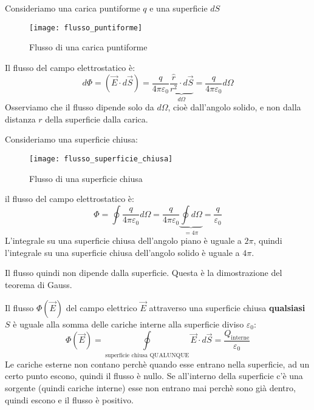 \documentclass[a4paper]{article}
\begin{document}
\begin{example}
  Consideriamo una carica puntiforme \( q \) e una superficie \( dS \) 
  \begin{figure}[H]
    \centering
    \texttt{[image: flusso\_puntiforme]}
    \caption{Flusso di una carica puntiforme}
  \end{figure}
  Il flusso del campo elettrostatico è:
  \[
    d \Phi = \left( \vec{E} \cdot d\vec{S} \right) = \frac{q}{4 \pi \varepsilon_0} 
    \underbrace{\frac{\hat{r}}{r^2} \cdot d\vec{S}}_{d \Omega} = \frac{q}{4 \pi \varepsilon_0}
    d \Omega
  \] 
  Osserviamo che il flusso dipende solo da \( d \Omega \), cioè dall'angolo solido,
  e non dalla distanza \( r \) della superficie dalla carica.
\end{example}
\begin{example}
  Consideriamo una superficie chiusa:
  \begin{figure}[H]
    \centering
    \texttt{[image: flusso\_superficie\_chiusa]}
    \caption{Flusso di una superficie chiusa}
  \end{figure}
  il flusso del campo elettrostatico è:
  \[
    \Phi = \oint \frac{q}{4 \pi \varepsilon_0} d \Omega = \frac{q}{4 \pi \varepsilon_0}
    \underbrace{\oint d \Omega}_{= 4 \pi} = \frac{q}{\varepsilon_0}
  \] 
  L'integrale su una superficie chiusa dell'angolo piano è uguale a \( 2 \pi  \),
  quindi l'integrale su una superficie chiusa dell'angolo solido è uguale a \( 4 \pi \).
\end{example}
Il flusso quindi non dipende dalla superficie. Questa è la dimostrazione del teorema
di Gauss.

\begin{theorem}
  Il flusso \( \Phi(\vec{E}) \) del campo elettrico \( \vec{E} \) attraverso una
  superficie chiusa \textbf{qualsiasi} \( S \) è uguale alla somma delle cariche interne alla superficie
  diviso \( \varepsilon_0 \):
  \[
    \Phi (\vec{E}) = \underset{\text{superficie chiusa QUALUNQUE}}{\oint} \vec{E} \cdot d \vec{S} = \frac{Q_{\text{interne}}}{\varepsilon_0}
  \] 
  Le cariche esterne non contano perchè quando esse entrano nella superficie, ad un
  certo punto escono, quindi il flusso è nullo. Se all'interno della superficie c'è
  una sorgente (quindi cariche interne) esse non entrano mai perchè sono già dentro,
  quindi escono e il flusso è positivo.
\end{theorem}
\end{document}

